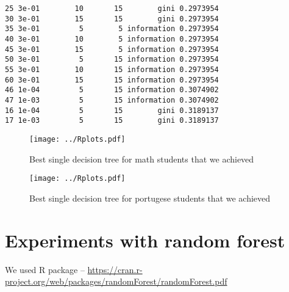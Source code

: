 \documentclass[a4paper]{article}
\begin{document}
\begin{verbatim}
25 3e-01        10       15        gini 0.2973954
30 3e-01        15       15        gini 0.2973954
35 3e-01         5        5 information 0.2973954
40 3e-01        10        5 information 0.2973954
45 3e-01        15        5 information 0.2973954
50 3e-01         5       15 information 0.2973954
55 3e-01        10       15 information 0.2973954
60 3e-01        15       15 information 0.2973954
46 1e-04         5       15 information 0.3074902
47 1e-03         5       15 information 0.3074902
16 1e-04         5       15        gini 0.3189137
17 1e-03         5       15        gini 0.3189137
\end{verbatim}




\begin{figure}[]
    \caption[]{Best single decision tree for math students that we achieved}
    \centering
    \texttt{[image: ../Rplots.pdf]}
    \label{fig:single1}
\end{figure}

\begin{figure}[]
    \caption[]{Best single decision tree for portugese students that we achieved}
    \centering
    \texttt{[image: ../Rplots.pdf]}
    \label{fig:single2}
\end{figure}


\newpage
\section{Experiments with random forest}
We used R package -- \url{https://cran.r-project.org/web/packages/randomForest/randomForest.pdf}
\end{document}
